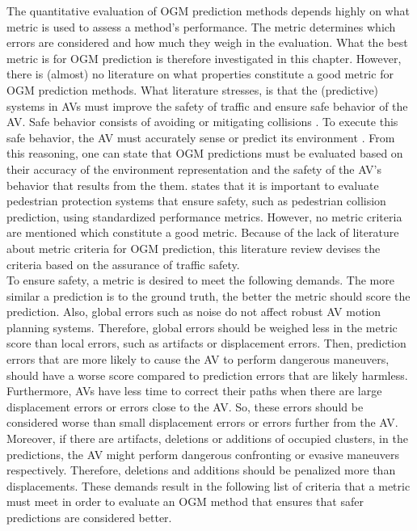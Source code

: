 The quantitative evaluation of \gls{OGM} prediction methods depends highly on what metric is used to assess a method's performance. The metric determines which errors are considered and how much they weigh in the evaluation. What the best metric is for \gls{OGM} prediction is therefore investigated in this chapter.
However, there is (almost) no literature on what properties constitute a good metric for \gls{OGM} prediction methods. What literature stresses, is that the (predictive) systems in \glspl{AV} must improve the safety of traffic and ensure safe behavior of the \gls{AV}. Safe behavior consists of avoiding or mitigating collisions \cite{kaempchen2009situation} \cite{annell2016probabilistic}. To execute this safe behavior, the \gls{AV} must accurately sense or predict its environment \cite{mitra2018towards} \cite{themann2015impact} \cite{annell2016probabilistic}. From this reasoning, one can state that \gls{OGM} predictions must be evaluated based on their accuracy of the environment representation and the safety of the \gls{AV}'s behavior that results from the them. \cite{gandhi2007pedestrian} states that it is important to evaluate pedestrian protection systems that ensure safety, such as pedestrian collision prediction, using standardized performance metrics. However, no metric criteria are mentioned which constitute a good metric. Because of the lack of literature about metric criteria for \gls{OGM} prediction, this literature review devises the criteria based on the assurance of traffic safety. \\

To ensure safety, a metric is desired to meet the following demands. The more similar a prediction is to the ground truth, the better the metric should score the prediction. Also, global errors such as noise do not affect robust \gls{AV} motion planning systems. Therefore, global errors should be weighed less in the metric score than local errors, such as artifacts or displacement errors. Then, prediction errors that are more likely to cause the \gls{AV} to perform dangerous maneuvers, should have a worse score compared to prediction errors that are likely harmless. Furthermore, \glspl{AV} have less time to correct their paths when there are large displacement errors or errors close to the \gls{AV}. So, these errors should be considered worse than small displacement errors or errors further from the \gls{AV}. Moreover, if there are artifacts, deletions or additions of occupied clusters, in the predictions, the \gls{AV} might perform dangerous confronting or evasive maneuvers respectively. Therefore, deletions and additions should be penalized more than displacements. These demands result in the following list of criteria that a metric must meet in order to evaluate an \gls{OGM} method that ensures that safer predictions are considered better.

